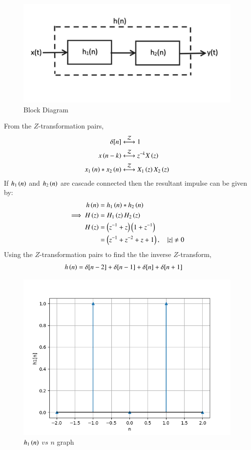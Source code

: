 \documentclass[journal,12pt,twocolumn]{IEEEtran}
\theoremstyle{remark}
\begin{document}
\begin{figure}[ht]
    \centering
    \includegraphics[width=\columnwidth]{figs/fig2.png}
    \caption{Block Diagram}
    \label{fig:g2022ee7.2}
\end{figure}  
From the $Z$-transformation pairs,
\begin{align}
    \delta[n] &\overset{\mathcal{Z}}{ \longleftrightarrow} 1  \label{eqn:g22ee7.1}  \\
    x\left(n-k\right) &\overset{\mathcal{Z}}{ \longleftrightarrow} z^{-k}X\left(z\right) \label{eqn:g22ee7.2}   \\
    x_1\left(n\right)\ast x_2\left(n\right) &\overset{\mathcal{Z}}{ \longleftrightarrow} X_1\left(z\right)X_2\left(z\right) \label{eqn:g22ee7.3}
\end{align}
If $h_1\left(n\right)$ and $h_2\left(n\right)$ are cascade connected then the resultant impulse can be given by:
\begin{align}
    h\left(n\right)&=h_1\left(n\right)\ast h_2\left(n\right)    \\
    \implies H\left(z\right)&=H_1\left(z\right)H_2\left(z\right)    \\
    H\left(z\right)&=\left(z^{-1}+z\right)\left(1+z^{-1}\right)   \\
    &=\left(z^{-1}+z^{-2}+z+1\right), \quad \left\vert z\right\vert\neq 0
\end{align}
Using the $Z$-transformation pairs to find the the inverse $Z$-transform,
\begin{align}
    h\left(n\right)&=\delta[n-2]+\delta[n-1]+\delta[n]+\delta[n+1]
\end{align}
\begin{figure}[ht]
    \centering
    \includegraphics[width=\columnwidth]{figs/fig3.png}
    \caption{$h_1\left(n\right)$ $vs$ $n$ graph}
    \label{fig:g2022ee7.3}
\end{figure}     
\end{document}
